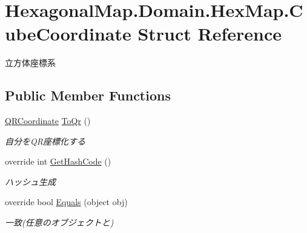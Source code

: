 \hypertarget{struct_hexagonal_map_1_1_domain_1_1_hex_map_1_1_cube_coordinate}{}\section{Hexagonal\+Map.\+Domain.\+Hex\+Map.\+Cube\+Coordinate Struct Reference}
\label{struct_hexagonal_map_1_1_domain_1_1_hex_map_1_1_cube_coordinate}


立方体座標系  


\subsection*{Public Member Functions}
\begin{DoxyCompactItemize}
\item 
\mbox{\hyperlink{struct_hexagonal_map_1_1_domain_1_1_hex_map_1_1_q_r_coordinate}{Q\+R\+Coordinate}} \mbox{\hyperlink{struct_hexagonal_map_1_1_domain_1_1_hex_map_1_1_cube_coordinate_a8662128d9d51bc42b759df18a3db0b9a}{To\+Qr}} ()
\begin{DoxyCompactList}\small\item\em 自分を\+Q\+R座標化する \end{DoxyCompactList}\item 
override int \mbox{\hyperlink{struct_hexagonal_map_1_1_domain_1_1_hex_map_1_1_cube_coordinate_a1c8ed91329cd9f60e3ee06af6153c945}{Get\+Hash\+Code}} ()
\begin{DoxyCompactList}\small\item\em ハッシュ生成 \end{DoxyCompactList}\item 
override bool \mbox{\hyperlink{struct_hexagonal_map_1_1_domain_1_1_hex_map_1_1_cube_coordinate_a5b65cc4212af2faca0226de7c5e670ca}{Equals}} (object obj)
\begin{DoxyCompactList}\small\item\em 一致(任意のオブジェクトと) \end{DoxyCompactList}\end{DoxyCompactItemize}
